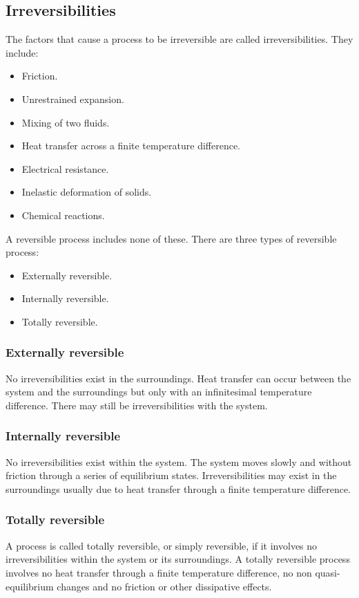 \subsection{Irreversibilities}
The factors that cause a process to be irreversible are called irreversibilities.
They include:
\begin{itemize}[noitemsep]
  \item Friction.
  \item Unrestrained expansion.
  \item Mixing of two fluids.
  \item Heat transfer across a finite temperature difference.
  \item Electrical resistance.
  \item Inelastic deformation of solids.
  \item Chemical reactions.
\end{itemize}
A reversible process includes none of these. There are three types of reversible process:
\begin{itemize}[noitemsep]
  \item Externally reversible.
  \item Internally reversible.
  \item Totally reversible.
\end{itemize}
\subsubsection{Externally reversible}
No irreversibilities exist in the surroundings. Heat transfer can occur between the system and the surroundings but only with an infinitesimal temperature difference. There may still be irreversibilities with the system.
\subsubsection{Internally reversible}
No irreversibilities exist within the system. The system moves slowly and without friction through a series of equilibrium states. Irreversibilities may exist in the surroundings usually due to heat transfer through a finite temperature difference.
\subsubsection{Totally reversible}
A process is called totally reversible, or simply reversible, if it involves no irreversibilities within the system or its surroundings. A totally reversible process involves no heat transfer through a finite temperature difference, no non quasi-equilibrium changes and no friction or other dissipative effects.
